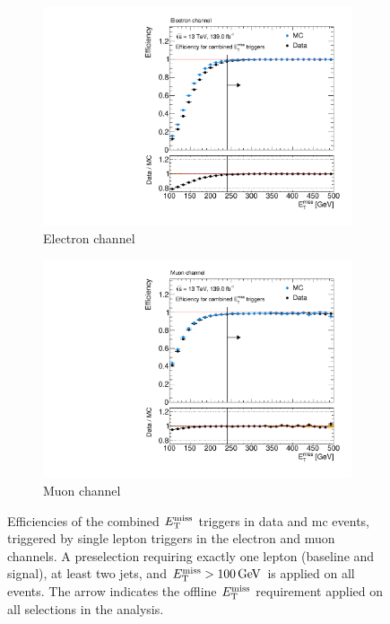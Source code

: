 \begin{figure}
	\centering
	\begin{subfigure}[b]{0.49\linewidth}
		\centering\includegraphics[width=\textwidth]{trigger/met_ele}
		\caption{Electron channel\label{fig:trigger_met_ele}}
	\end{subfigure}\hfill
	\begin{subfigure}[b]{0.49\linewidth}
		\centering\includegraphics[width=\textwidth]{trigger/met_mu}
		\caption{Muon channel\label{fig:trigger_met_mu}}
	\end{subfigure}
		\caption{Efficiencies of the combined $E_{\textrm{T}}^{\textrm{miss}}$ triggers in data and \gls{mc} events, triggered by single lepton triggers in the   electron and  muon channels. A preselection requiring exactly one lepton (baseline and signal), at least two jets, and $\etmiss > \SI{100}{\GeV}$ is applied on all events. The arrow indicates the offline $E_{\textrm{T}}^{\textrm{miss}}$ requirement applied on all selections in the analysis.}\label{fig:trigger_eff}
\end{figure}


